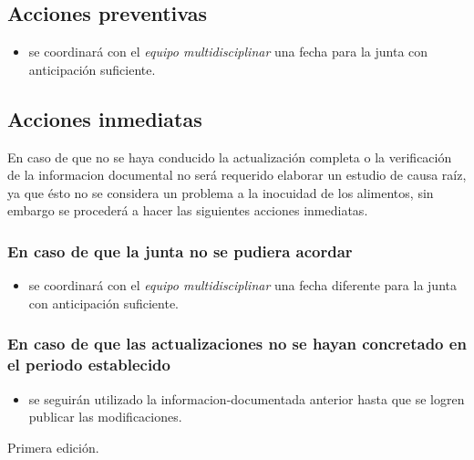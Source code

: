 \subsection{Acciones preventivas}
\begin{itemize}
    \item se coordinará con el \emph{equipo multidisciplinar} una fecha para la junta con anticipación suficiente.
\end{itemize}

\subsection{Acciones inmediatas}
En caso de que no se haya conducido la actualización completa o la verificación de la informacion documental no será requerido elaborar un estudio de causa raíz, ya que ésto no se considera un problema a la inocuidad de los alimentos, sin embargo se procederá a hacer las siguientes acciones inmediatas.

\subsubsection*{En caso de que la junta no se pudiera acordar}
\begin{itemize}
    \item se coordinará con el \emph{equipo multidisciplinar} una fecha diferente para la junta con anticipación suficiente.
\end{itemize}

\subsubsection*{En caso de que las actualizaciones no se hayan concretado en el periodo establecido}
\begin{itemize}
    \item se seguirán utilizado la \gls{informacion-documentada} anterior hasta que se logren publicar las modificaciones.
\end{itemize}

\begin{changelog}[simple, sectioncmd=\subsection*,label=changelog-1.0]
    \begin{version}[v=1.0, date=2023--01, author=Pablo E. Alanis]
        \item Primera edición.
    \end{version}
\end{changelog}